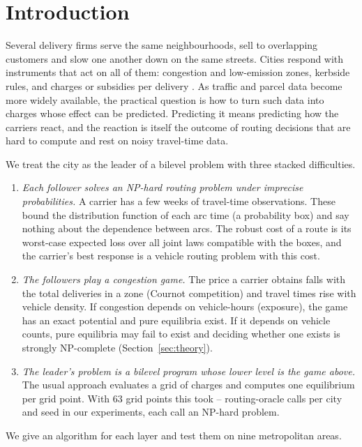 \documentclass[preprint,12pt]{elsarticle}
\theoremstyle{definition}
\theoremstyle{remark}
\begin{document}


\section{Introduction}\label{sec:intro}

Several delivery firms serve the same neighbourhoods, sell to overlapping customers and slow one another down on the same streets. Cities respond with instruments that act on all of them: congestion and low-emission zones, kerbside rules, and charges or subsidies per delivery \citep{Quak2009,HolguinVeras2016,Dey2019,XuSun2024}. As traffic and parcel data become more widely available, the practical question is how to turn such data into charges whose effect can be predicted. Predicting it means predicting how the carriers react, and the reaction is itself the outcome of routing decisions that are hard to compute and rest on noisy travel-time data.

We treat the city as the leader of a bilevel problem with three stacked difficulties.
\begin{enumerate}[label=(\arabic*),leftmargin=*]
\item \emph{Each follower solves an NP-hard routing problem under imprecise probabilities.} A carrier has a few weeks of travel-time observations. These bound the distribution function of each arc time (a probability box) and say nothing about the dependence between arcs. The robust cost of a route is its worst-case expected loss over all joint laws compatible with the boxes, and the carrier's best response is a vehicle routing problem with this cost.
\item \emph{The followers play a congestion game.} The price a carrier obtains falls with the total deliveries in a zone (Cournot competition) and travel times rise with vehicle density. If congestion depends on vehicle-hours (exposure), the game has an exact potential and pure equilibria exist. If it depends on vehicle counts, pure equilibria may fail to exist and deciding whether one exists is strongly NP-complete (Section~\ref{sec:theory}).
\item \emph{The leader's problem is a bilevel program whose lower level is the game above.} The usual approach evaluates a grid of charges and computes one equilibrium per grid point. With 63 grid points this took \GridCallsFullMin--\GridCallsFullMax{} routing-oracle calls per city and seed in our experiments, each call an NP-hard problem.
\end{enumerate}
We give an algorithm for each layer and test them on nine metropolitan areas.
\end{document}
